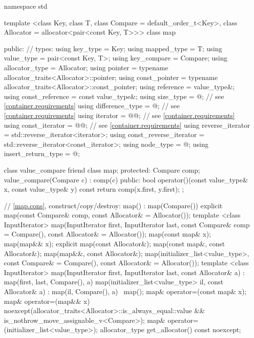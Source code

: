 \begin{codeblock}
namespace std {
  template <class Key, class T, class Compare = default_order_t<Key>,
            class Allocator = allocator<pair<const Key, T>>>
  class map {
  public:
    // types:
    using key_type               = Key;
    using mapped_type            = T;
    using value_type             = pair<const Key, T>;
    using key_compare            = Compare;
    using allocator_type         = Allocator;
    using pointer                = typename allocator_traits<Allocator>::pointer;
    using const_pointer          = typename allocator_traits<Allocator>::const_pointer;
    using reference              = value_type&;
    using const_reference        = const value_type&;
    using size_type              = @\impdef@; // see \ref{container.requirements}
    using difference_type        = @\impdef@; // see \ref{container.requirements}
    using iterator               = @@; // see \ref{container.requirements}
    using const_iterator         = @@; // see \ref{container.requirements}
    using reverse_iterator       = std::reverse_iterator<iterator>;
    using const_reverse_iterator = std::reverse_iterator<const_iterator>;
    using node_type              = @\unspec@;
    using insert_return_type     = @\unspec@;

    class value_compare {
      friend class map;
    protected:
      Compare comp;
      value_compare(Compare c) : comp(c) {}
    public:
      bool operator()(const value_type& x, const value_type& y) const {
        return comp(x.first, y.first);
      }
    };

    // \ref{map.cons}, construct/copy/destroy:
    map() : map(Compare()) { }
    explicit map(const Compare& comp, const Allocator& = Allocator());
    template <class InputIterator>
      map(InputIterator first, InputIterator last,
          const Compare& comp = Compare(), const Allocator& = Allocator());
    map(const map& x);
    map(map&& x);
    explicit map(const Allocator&);
    map(const map&, const Allocator&);
    map(map&&, const Allocator&);
    map(initializer_list<value_type>,
      const Compare& = Compare(),
      const Allocator& = Allocator());
    template <class InputIterator>
      map(InputIterator first, InputIterator last, const Allocator& a)
        : map(first, last, Compare(), a) { }
    map(initializer_list<value_type> il, const Allocator& a)
      : map(il, Compare(), a) { }
    ~map();
    map& operator=(const map& x);
    map& operator=(map&& x)
      noexcept(allocator_traits<Allocator>::is_always_equal::value &&
               is_nothrow_move_assignable_v<Compare>);
    map& operator=(initializer_list<value_type>);
    allocator_type get_allocator() const noexcept;

}}
\end{codeblock}
